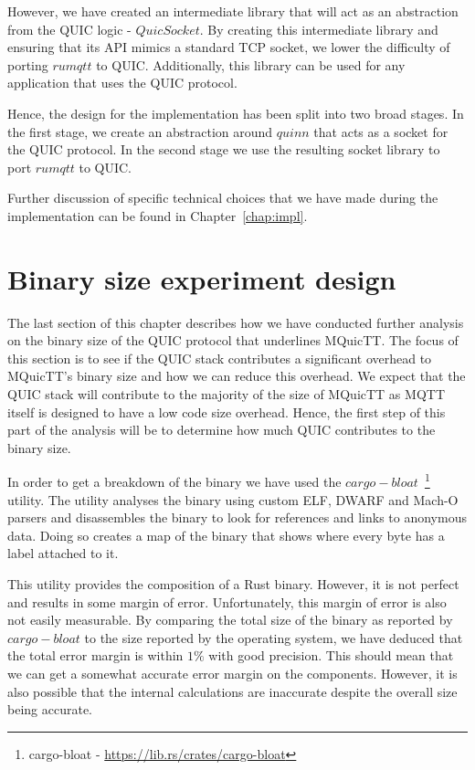 However, we have created an intermediate library that will act as an abstraction from the QUIC logic - $QuicSocket$.
By creating this intermediate library and ensuring that its API mimics a standard TCP socket, we lower the difficulty of porting $rumqtt$ to QUIC.
Additionally, this library can be used for any application that uses the QUIC protocol.

Hence, the design for the implementation has been split into two broad stages.
In the first stage, we create an abstraction around $quinn$ that acts as a socket for the QUIC protocol.
In the second stage we use the resulting socket library to port $rumqtt$ to QUIC.

Further discussion of specific technical choices that we have made during the implementation can be found in Chapter~\ref{chap:impl}.



\section{Binary size experiment design}

The last section of this chapter describes how we have conducted further analysis on the binary size of the QUIC protocol that underlines MQuicTT.
The focus of this section is to see if the QUIC stack contributes a significant overhead to MQuicTT's binary size and how we can reduce this overhead.
We expect that the QUIC stack will contribute to the majority of the size of MQuicTT as MQTT itself is designed to have a low code size overhead.
Hence, the first step of this part of the analysis will be to determine how much QUIC contributes to the binary size.

In order to get a breakdown of the binary we have used the $cargo-bloat$~\footnote{cargo-bloat - \url{https://lib.rs/crates/cargo-bloat}} utility.
The utility analyses the binary using custom ELF, DWARF and Mach-O parsers and disassembles the binary to look for references and links to anonymous data.
Doing so creates a map of the binary that shows where every byte has a label attached to it.

This utility provides the composition of a Rust binary. 
However, it is not perfect and results in some margin of error.
Unfortunately, this margin of error is also not easily measurable.
By comparing the total size of the binary as reported by $cargo-bloat$ to the size reported by the operating system, we have deduced that the total error margin is within $1\%$ with good precision.
This should mean that we can get a somewhat accurate error margin on the components. 
However, it is also possible that the internal calculations are inaccurate despite the overall size being accurate.

